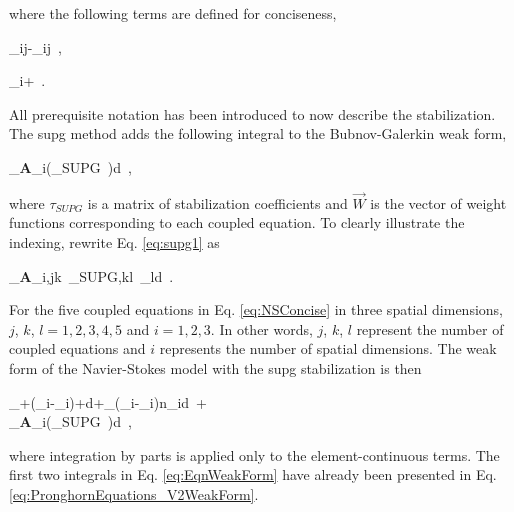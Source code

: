 \noindent where the following terms are defined for conciseness,

\beq
\label{eq:tilde_delta}
\tilde{\delta}_{ij}-\delta_{ij}\ ,
\eeq

\beq
\label{eq:zeta_placeholder}
\zeta_i\equiv{}+\ .
\eeq

\noindent All prerequisite notation has been introduced to now describe the stabilization. The \gls{supg} method adds the following integral to the Bubnov-Galerkin weak form,

\beq
\label{eq:supg1}
\int_\Omega\epsilon\left\lbrack\textbf{A}_i\left(\tau_{SUPG}\ \right)\right\rbrack\cdot{}d\Omega\ ,
\eeq

\noindent where \(\tau_{SUPG}\) is a matrix of stabilization coefficients and \(\vec{W}\) is the vector of weight functions corresponding to each coupled equation. To clearly illustrate the indexing, rewrite Eq. \eqref{eq:supg1} as

\beq
\label{eq:supg2}
\int_\Omega\epsilon\textbf{A}_{i,jk\ }\tau_{SUPG,kl\ }_ld\Omega\ .
\eeq

\noindent For the five coupled equations in Eq. \eqref{eq:NSConcise} in three spatial dimensions, \(j\), \(k\), \(l=1,2,3,4,5\) and \(i=1,2,3\). In other words, \(j\), \(k\), \(l\) represent the number of coupled equations and \(i\) represents the number of spatial dimensions. The weak form of the Navier-Stokes model with the \gls{supg} stabilization is then

\beqa
\label{eq:EqnWeakForm}
\int_{\Omega}\left\lbrack\epsilon{}\cdot{}+\cdot\left(_i-\epsilon{}_i\right)+\cdot{}\right\rbrack d\Omega+\int_{\Gamma}\left(\epsilon{}_i-_i\right)\cdot{}n_id\Gamma\ +\hspace{1cm}\\
\int_\Omega\epsilon\left\lbrack\textbf{A}_i\left(\tau_{SUPG}\ \right)\right\rbrack\cdot{}d\ ,
\eeqa

\noindent where integration by parts is applied only to the element-continuous terms. The first two integrals in Eq. \eqref{eq:EqnWeakForm} have already been presented in Eq. \eqref{eq:PronghornEquations_V2WeakForm}.

